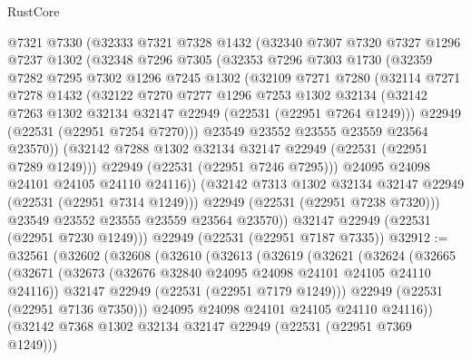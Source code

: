 \begin{lexlean}{RustCore}
\begin{coremodule}
        @7321
        @7330
        (@32333
          @7321
          @7328
          @1432
          (@32340
            @7307
            @7320
            @7327
            @1296
            @7237
            @1302
            (@32348
              @7296
              @7305
              (@32353
                @7296
                @7303
                @1730
                (@32359
                  @7282
                  @7295
                  @7302
                  @1296
                  @7245
                  @1302
                  (@32109
                    @7271
                    @7280
                    (@32114
                      @7271
                      @7278
                      @1432
                      (@32122
                        @7270
                        @7277
                        @1296
                        @7253
                        @1302
                        @32134
                        (@32142 @7263 @1302 @32134 @32147 @22949 (@22531 (@22951 @7264 @1249)))
                        @22949
                        (@22531 (@22951 @7254 @7270)))
                      @23549
                      @23552
                      @23555
                      @23559
                      @23564
                      @23570))
                  (@32142 @7288 @1302 @32134 @32147 @22949 (@22531 (@22951 @7289 @1249)))
                  @22949
                  (@22531 (@22951 @7246 @7295)))
                @24095
                @24098
                @24101
                @24105
                @24110
                @24116))
            (@32142 @7313 @1302 @32134 @32147 @22949 (@22531 (@22951 @7314 @1249)))
            @22949
            (@22531 (@22951 @7238 @7320)))
          @23549
          @23552
          @23555
          @23559
          @23564
          @23570))
      @32147
      @22949
      (@22531 (@22951 @7230 @1249)))
    @22949
    (@22531 (@22951 @7187 @7335))
@32912 := @32561
    (@32602
      (@32608
        (@32610
          (@32613
            (@32619
              (@32621
                (@32624
                  (@32665
                    (@32671
                      (@32673 (@32676 @32840 @24095 @24098 @24101 @24105 @24110 @24116))
                      @32147
                      @22949
                      (@22531 (@22951 @7179 @1249)))
                    @22949
                    (@22531 (@22951 @7136 @7350)))
                  @24095
                  @24098
                  @24101
                  @24105
                  @24110
                  @24116))
              (@32142 @7368 @1302 @32134 @32147 @22949 (@22531 (@22951 @7369 @1249)))

\end{coremodule}
\end{lexlean}
